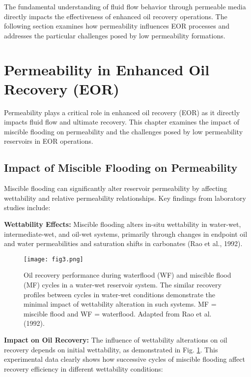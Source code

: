 \documentclass[journal]{IEEEtran}
\begin{document}
The fundamental understanding of fluid flow behavior through permeable media directly impacts the effectiveness of enhanced oil recovery operations. The following section examines how permeability influences EOR processes and addresses the particular challenges posed by low permeability formations.


\section{Permeability in Enhanced Oil Recovery (EOR)}
Permeability plays a critical role in enhanced oil recovery (EOR) as it directly impacts fluid flow and ultimate recovery. This chapter examines the impact of miscible flooding on permeability and the challenges posed by low permeability reservoirs in EOR operations.

\subsection{Impact of Miscible Flooding on Permeability}
Miscible flooding can significantly alter reservoir permeability by affecting wettability and relative permeability relationships. Key findings from laboratory studies include:

\textbf{Wettability Effects:} Miscible flooding alters in-situ wettability in water-wet, intermediate-wet, and oil-wet systems, primarily through changes in endpoint oil and water permeabilities and saturation shifts in carbonates (Rao et al., 1992).

\begin{figure}[t]
    \centering
    \texttt{[image: fig3.png]}
    \caption{Oil recovery performance during waterflood (WF) and miscible flood (MF) cycles in a water-wet reservoir system. The similar recovery profiles between cycles in water-wet conditions demonstrate the minimal impact of wettability alteration in such systems. MF = miscible flood and WF = waterflood. Adapted from Rao et al. (1992).}
    \label{fig:miscible_recovery}
    \end{figure}

\textbf{Impact on Oil Recovery:} The influence of wettability alterations on oil recovery depends on initial wettability, as demonstrated in Fig. \ref{fig:miscible_recovery}. This experimental data clearly shows how successive cycles of miscible flooding affect recovery efficiency in different wettability conditions:
\end{document}
